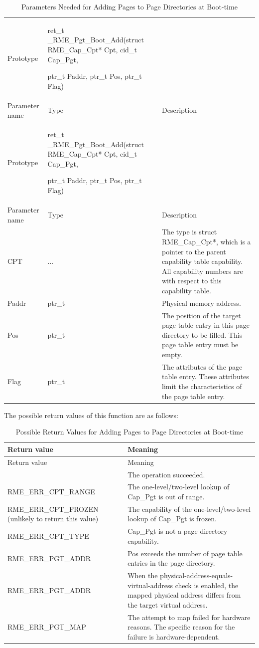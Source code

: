 \begin{xltabular}{\textwidth}{@{}>{\hsize\raggedright\arraybackslash}X>{\hsize\raggedright\arraybackslash}X>{\hsize\raggedright\arraybackslash}X@{}}
\caption{Parameters Needed for Adding Pages to Page Directories at Boot-time}\label{tab:7-49-add-page-to-page-directory-at-boot-parameters}\\
\toprule
Prototype\strut
 & ret\_t \_RME\_Pgt\_Boot\_Add(struct RME\_Cap\_Cpt* Cpt, cid\_t Cap\_Pgt,

ptr\_t Paddr, ptr\_t Pos, ptr\_t Flag)\strut
 & \strut
\tabularnewline
Parameter name & Type & Description\tabularnewline
\endfirsthead
\toprule
Prototype\strut
 & ret\_t \_RME\_Pgt\_Boot\_Add(struct RME\_Cap\_Cpt* Cpt, cid\_t Cap\_Pgt,

ptr\_t Paddr, ptr\_t Pos, ptr\_t Flag)\strut
 & \strut
\tabularnewline
Parameter name & Type & Description\tabularnewline
\midrule
\endhead
\bottomrule
\endlastfoot
CPT & ... &
The type is struct RME\_Cap\_Cpt*, which is a pointer to the parent capability table capability. All capability numbers are with respect to this capability table.\tabularnewline
Paddr & ptr\_t & Physical memory address.\tabularnewline
Pos & ptr\_t &
The position of the target page table entry in this page directory to be filled. This page table entry must be empty.\tabularnewline
Flag & ptr\_t &
The attributes of the page table entry. These attributes limit the characteristics of the page table entry.\tabularnewline
\end{xltabular}
\nopagebreak[4]

The possible return values of this function are as follows:

\begin{xltabular}{\textwidth}{@{}>{\hsize\raggedright\arraybackslash}X>{\hsize\raggedright\arraybackslash}X@{}}
\caption{Possible Return Values for Adding Pages to Page Directories at Boot-time}\label{tab:7-50-add-page-to-page-directory-at-boot-return-values}\\
\toprule
Return value & Meaning\tabularnewline
\endfirsthead
\toprule
Return value & Meaning\tabularnewline
\midrule
\endhead
\bottomrule
{} & The operation succeeded.\tabularnewline
    RME\_ERR\_CPT\_RANGE & The one-level/two-level lookup of Cap\_Pgt is out of range.\tabularnewline
    RME\_ERR\_CPT\_FROZEN (unlikely to return this value) & The capability of the one-level/two-level lookup of Cap\_Pgt is frozen.\tabularnewline
    RME\_ERR\_CPT\_TYPE & Cap\_Pgt is not a page directory capability.\tabularnewline
    RME\_ERR\_PGT\_ADDR & Pos exceeds the number of page table entries in the page directory.\tabularnewline
    RME\_ERR\_PGT\_ADDR & When the physical-address-equals-virtual-address check is enabled, the mapped physical address differs from the target virtual address.\tabularnewline
    RME\_ERR\_PGT\_MAP & The attempt to map failed for hardware reasons. The specific reason for the failure is hardware-dependent.\tabularnewline
\end{xltabular}
\nopagebreak[4]


